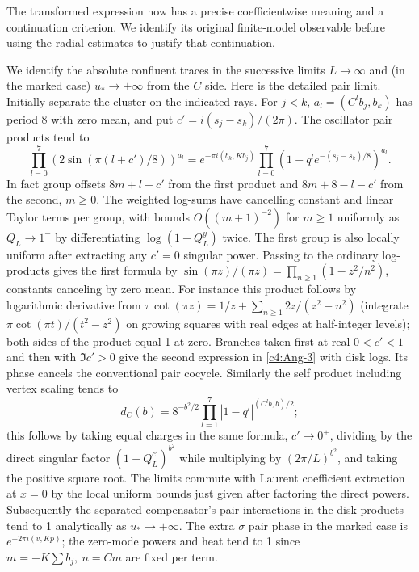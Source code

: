 The transformed expression now has a precise coefficientwise meaning and a continuation criterion. We identify its original finite-model observable before using the radial estimates to justify that continuation.

We identify the absolute confluent traces in the successive limits \(L\to\infty\) and (in the marked case) \(u_*\to+\infty\) from the \(C\) side. Here is the detailed pair limit. Initially separate the cluster on the indicated rays. For \(j<k\), \(a_l=(C^l b_j,b_k)\) has period 8 with zero mean, and put \(c'=i(s_j-s_k)/(2\pi)\). The oscillator pair products tend to
\begin{equation}
 \prod_{l=0}^7(2\sin(\pi(l+c')/8))^{a_l}
 = e^{-\pi i(b_k,K b_j)}
     \prod_{l=0}^7(1-q^l e^{-(s_j-s_k)/8})^{a_l}.                        \label{c4:Ang-3}
\end{equation}
In fact group offsets \(8m+l+c'\) from the first product and \(8m+8-l-c'\) from the second, \(m\ge0\). The weighted log-sums have cancelling constant and linear Taylor terms per group, with bounds \(O((m+1)^{-2})\) for \(m\ge1\) uniformly as \(Q_L\to1^-\) by differentiating \(\log(1-Q_L^y)\) twice. The first group is also locally uniform after extracting any \(c'=0\) singular power. Passing to the ordinary log-products gives the first formula by \(\sin(\pi z)/(\pi z)=\prod_{n\ge1}(1-z^2/n^2)\), constants canceling by zero mean. For instance this product follows by logarithmic derivative from \(\pi\cot(\pi z)=1/z+\sum_{n\ge1}2z/(z^2-n^2)\) (integrate \(\pi\cot(\pi t)/(t^2-z^2)\) on growing squares with real edges at half-integer levels); both sides of the product equal 1 at zero. Branches taken first at real \(0<c'<1\) and then with \(\Im c'>0\) give the second expression in \eqref{c4:Ang-3} with disk logs. Its phase cancels the conventional pair cocycle. Similarly the self product including vertex scaling tends to
\[
 d_C(b)=8^{-b^2/2}\prod_{l=1}^7 |1-q^l|^{(C^l b,b)/2};
\]
this follows by taking equal charges in the same formula, \(c'\to0^+\), dividing by the direct singular factor \((1-Q_L^{c'})^{b^2}\) while multiplying by \((2\pi/L)^{b^2}\), and taking the positive square root. The limits commute with Laurent coefficient extraction at \(x=0\) by the local uniform bounds just given after factoring the direct powers. Subsequently the separated compensator's pair interactions in the disk products tend to 1 analytically as \(u_*\to+\infty\). The extra \(\sigma\) pair phase in the marked case is \(e^{-2\pi i(v,K p)}\); the zero-mode powers and heat tend to 1 since \(m=-K\sum b_j,\ n=Cm\) are fixed per term.

